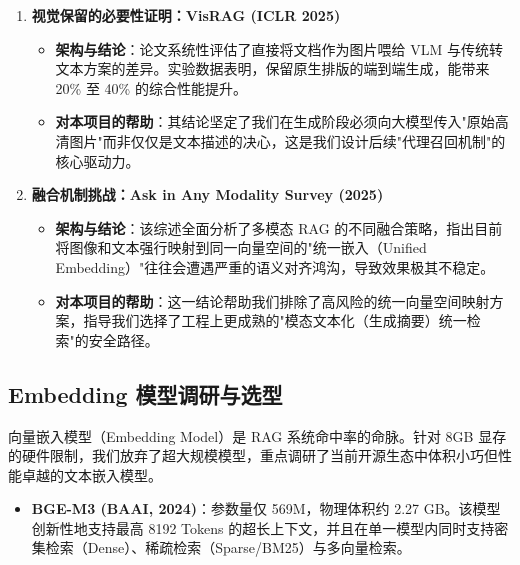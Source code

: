 ﻿\documentclass[UTF8, heading=true]{ctexart}
\begin{document}
\begin{enumerate}
    \begin{itemize}
        \item \textbf{架构与结论}：该研究提出了"三段式"框架：先提取页面视觉特征，再通过近似最近邻（ANN）引擎检索出 Top-K 页面，最后将这几个页面的特征与 Query 统一送入多模态大模型进行跨页推理。
        \item \textbf{对本项目的帮助}：它为我们系统的整体宏观架构提供了直接模板，验证了"检索器（缩小范围）+ 生成器（深度推理）"解耦架构在长篇多模态文档处理中的绝对必要性与有效性。
    \end{itemize}

    \item \textbf{视觉保留的必要性证明：VisRAG (ICLR 2025)}

    \begin{itemize}
        \item \textbf{架构与结论}：论文系统性评估了直接将文档作为图片喂给 VLM 与传统转文本方案的差异。实验数据表明，保留原生排版的端到端生成，能带来 20\% 至 40\% 的综合性能提升。
        \item \textbf{对本项目的帮助}：其结论坚定了我们在生成阶段必须向大模型传入"原始高清图片"而非仅仅是文本描述的决心，这是我们设计后续"代理召回机制"的核心驱动力。
    \end{itemize}

    \item \textbf{融合机制挑战：Ask in Any Modality Survey (2025)}

    \begin{itemize}
        \item \textbf{架构与结论}：该综述全面分析了多模态 RAG 的不同融合策略，指出目前将图像和文本强行映射到同一向量空间的"统一嵌入（Unified Embedding）"往往会遭遇严重的语义对齐鸿沟，导致效果极其不稳定。
        \item \textbf{对本项目的帮助}：这一结论帮助我们排除了高风险的统一向量空间映射方案，指导我们选择了工程上更成熟的"模态文本化（生成摘要）统一检索"的安全路径。
    \end{itemize}
\end{enumerate}


\subsection{Embedding 模型调研与选型}

向量嵌入模型（Embedding Model）是 RAG 系统命中率的命脉。针对 8GB 显存的硬件限制，我们放弃了超大规模模型，重点调研了当前开源生态中体积小巧但性能卓越的文本嵌入模型。

\begin{itemize}
    \item \textbf{BGE-M3 (BAAI, 2024)}：参数量仅 569M，物理体积约 2.27 GB。该模型创新性地支持最高 8192 Tokens 的超长上下文，并且在单一模型内同时支持密集检索（Dense）、稀疏检索（Sparse/BM25）与多向量检索。
\end{itemize}
\end{document}
